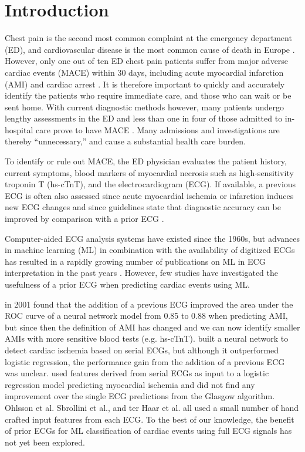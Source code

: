 \documentclass[preprint]{elsarticle}
\begin{document}


\section{Introduction}
\label{sec:introduction}
Chest pain is the second most common complaint at the emergency department (ED), and cardiovascular disease is the most common cause of death in Europe \citep{timmis2022}. However, only one out of ten ED chest pain patients suffer from major adverse cardiac events (MACE) within 30 days, including acute myocardial infarction (AMI) and cardiac arrest \citep{mokhtari2016}. It is therefore important to quickly and accurately identify the patients who require immediate care, and those who can wait or be sent home. With current diagnostic methods however, many patients undergo lengthy assessments in the ED and less than one in four of those admitted to in-hospital care prove to have MACE \citep{????}. Many admissions and investigations are thereby ``unnecessary,'' and cause a substantial health care burden.

To identify or rule out MACE, the ED physician evaluates the patient history, current symptoms, blood markers of myocardial necrosis such as high-sensitivity troponin T (hs-cTnT), and the electrocardiogram (ECG). If available, a previous ECG is often also assessed since acute myocardial ischemia or infarction induces new ECG changes and since guidelines state that diagnostic accuracy can be improved by comparison with a prior ECG \citep{anderson2013,lee1990}.

Computer-aided ECG analysis systems have existed since the 1960s, but advances in machine learning (ML) in combination with the availability of digitized ECGs has resulted in a rapidly growing number of publications on ML in ECG interpretation in the past years \citep{pipberger1961,ansari2017,liu2021}. However, few studies have investigated the usefulness of a prior ECG when predicting cardiac events using ML. 

\citet{ohlsson2001} in 2001 found that the addition of a previous ECG improved the area under the ROC curve of a neural network model from 0.85 to 0.88 when predicting AMI, but since then the definition of AMI has changed and we can now identify smaller AMIs with more sensitive blood tests (e.g. hs-cTnT). \citet{sbrollini2019} built a neural network to detect cardiac ischemia based on serial ECGs, but although it outperformed logistic regression, the performance gain from the addition of a previous ECG was unclear. \citet{terhaar2019} used features derived from serial ECGs as input to a logistic regression model predicting myocardial ischemia and did not find any improvement over the single ECG predictions from the Glasgow algorithm. Ohlsson et al. Sbrollini et al., and ter Haar et al. all used a small number of hand crafted input features from each ECG. To the best of our knowledge, the benefit of prior ECGs for ML classification of cardiac events using full ECG signals has not yet been explored.
\end{document}
